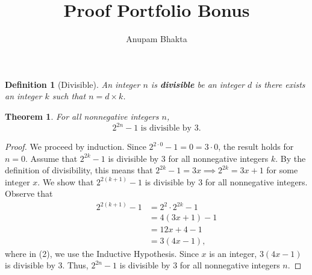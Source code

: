 \documentclass[11pt]{article}
\title{Proof Portfolio Bonus}
\author{Anupam Bhakta}
\newtheorem{theorem}{Theorem}
\newtheorem{definition}{Definition}
\begin{document}
	
\maketitle

\begin{definition}[Divisible]
	An integer $n$ is {\bf divisible} be an integer $d$ is there exists an integer $k$ such that $n=d\times k$.
\end{definition}

\begin{theorem}
For all nonnegative integers $n$, 
\[2^{2n}-1\text{ is divisible by }3.\]
\end{theorem}

\begin{proof}
	We proceed by induction. Since $2^{2\cdot0}-1=0=3\cdot0$, the result holds for $n=0$. Assume that $2^{2k}-1$ is divisible by 3 for all nonnegative integers $k$. By the definition of divisibility, this means that $2^{2k}-1=3x \implies 2^{2k}=3x+1$ for some integer $x$. We show that $2^{2(k+1)}-1$ is divisible by 3 for all nonnegative integers. Observe that 
	\begin{align}
		2^{2(k+1)}-1 &= 2^{2}\cdot2^{2k}-1 \\
		&= 4(3x+1)-1 \\
		&= 12x+4-1 \\
		&= 3(4x-1),
	\end{align}
	where in (2), we use the Inductive Hypothesis. Since $x$ is an integer, $3(4x-1)$ is divisible by $3$. Thus, $2^{2n}-1$ is divisible by 3 for all nonnegative integers $n$.
\end{proof}
\end{document}
